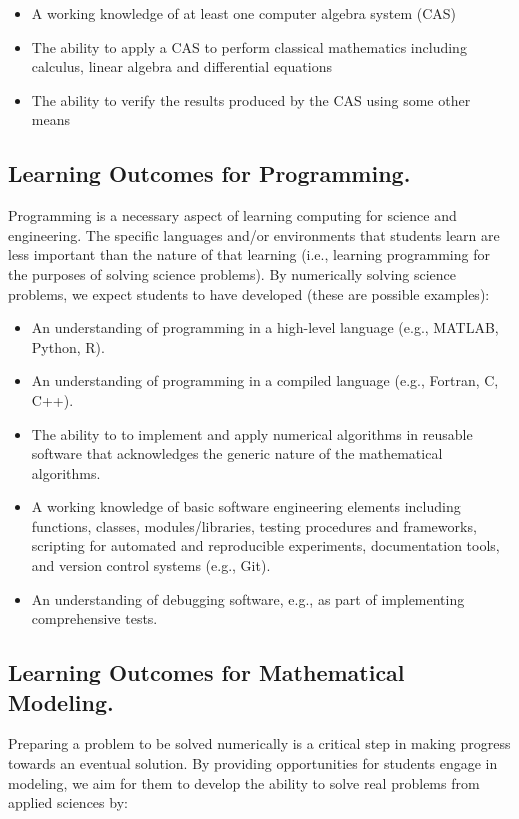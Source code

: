 \documentclass[graybox,envcountchap,sectrefs]{svmult}
\begin{document}
\begin{itemize}
\item A working knowledge of at least one computer algebra system (CAS)

\item The ability to apply a CAS to perform classical mathematics including calculus, linear algebra and differential equations

\item The ability to verify the results produced by the CAS using some other means
\end{itemize}


\subsection{Learning Outcomes for Programming.}
Programming is a necessary aspect of learning computing for science
and engineering. The specific languages and/or environments that
students learn are less important than the nature of that learning
(i.e., learning programming for the purposes of solving science
problems). By numerically solving science problems, we expect students
to have developed (these are possible examples):

\begin{itemize}
\item An understanding of programming in a high-level language (e.g., MATLAB, Python, R).

\item An understanding of programming in a compiled language (e.g., Fortran, C, C++).

\item The ability to to implement and apply numerical algorithms in reusable software that acknowledges the generic nature of the mathematical algorithms.

\item A working knowledge of basic software engineering elements including functions, classes, modules/libraries, testing procedures and frameworks, scripting for automated and reproducible experiments, documentation tools, and version control systems (e.g., Git).

\item An understanding of debugging software, e.g., as part of implementing comprehensive tests.
\end{itemize}


\subsection{Learning Outcomes for Mathematical Modeling.}
Preparing a problem to be solved numerically is a critical step in making progress towards an eventual solution. By providing opportunities for students engage in modeling, we aim for them to develop the ability to solve real problems from applied sciences by:
\end{document}
